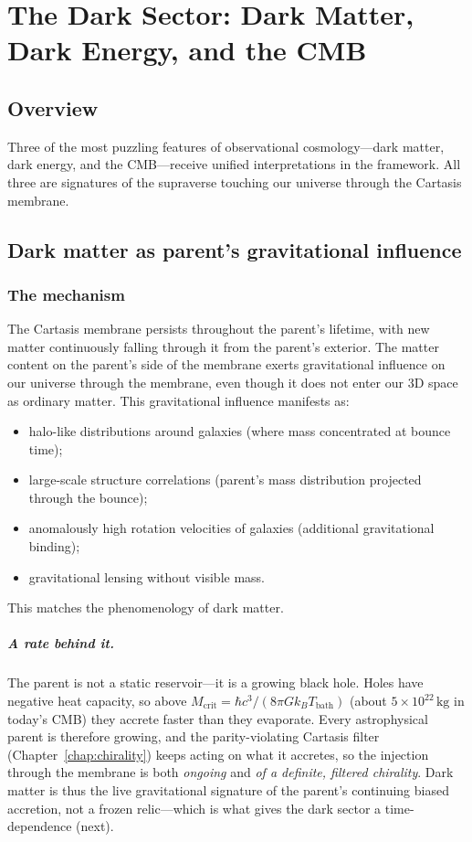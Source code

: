 \chapter{The Dark Sector: Dark Matter, Dark Energy, and the CMB}
\label{chap:darksector}

\section{Overview}

Three of the most puzzling features of observational cosmology---dark matter,
dark energy, and the CMB---receive unified interpretations in the \SCT
framework. All three are signatures of the supraverse touching our universe
through the Cartasis membrane.

\section{Dark matter as parent's gravitational influence}

\subsection{The mechanism}

The Cartasis membrane persists throughout the parent's lifetime, with new matter
continuously falling through it from the parent's exterior. The matter content on
the parent's side of the membrane exerts gravitational influence on our universe
through the membrane, even though it does not enter our 3D space as ordinary
matter. This gravitational influence manifests as:

\begin{itemize}
  \item halo-like distributions around galaxies (where mass concentrated at
    bounce time);
  \item large-scale structure correlations (parent's mass distribution projected
    through the bounce);
  \item anomalously high rotation velocities of galaxies (additional
    gravitational binding);
  \item gravitational lensing without visible mass.
\end{itemize}

This matches the phenomenology of dark matter.

\paragraph{A rate behind it.} The parent is not a static reservoir---it is a
growing black hole. Holes have negative heat capacity, so above
$M_{\mathrm{crit}} = \hbar c^3/(8\pi G k_B T_{\mathrm{bath}})$ (about
$5\times10^{22}\,\mathrm{kg}$ in today's CMB) they accrete faster than they
evaporate. Every astrophysical parent is therefore growing, and the
parity-violating Cartasis filter (Chapter~\ref{chap:chirality}) keeps acting on
what it accretes, so the injection through the membrane is both \emph{ongoing}
and \emph{of a definite, filtered chirality}. Dark matter is thus the live
gravitational signature of the parent's continuing biased accretion, not a frozen
relic---which is what gives the dark sector a time-dependence (next).

